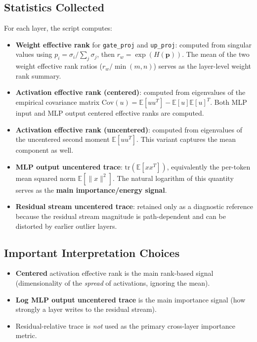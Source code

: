 \documentclass[11pt]{article}
\begin{document}
\subsection{Statistics Collected}
For each layer, the script computes:
\begin{itemize}
    \item \textbf{Weight effective rank} for \texttt{gate\_proj} and \texttt{up\_proj}: computed from singular values using $p_i = \sigma_i / \sum_j \sigma_j$, then $r_w = \exp(H(\mathbf{p}))$.  The mean of the two weight effective rank ratios ($r_w / \min(m,n)$) serves as the layer-level weight rank summary.
    \item \textbf{Activation effective rank (centered)}: computed from eigenvalues of the empirical covariance matrix $\mathrm{Cov}(u) = \mathbb{E}[uu^T] - \mathbb{E}[u]\mathbb{E}[u]^T$.  Both MLP input and MLP output centered effective ranks are computed.
    \item \textbf{Activation effective rank (uncentered)}: computed from eigenvalues of the uncentered second moment $\mathbb{E}[uu^T]$.  This variant captures the mean component as well.
    \item \textbf{MLP output uncentered trace}: $\mathrm{tr}(\mathbb{E}[xx^T])$, equivalently the per-token mean squared norm $\mathbb{E}[\|x\|^2]$.  The natural logarithm of this quantity serves as the \textbf{main importance/energy signal}.
    \item \textbf{Residual stream uncentered trace}: retained only as a diagnostic reference because the residual stream magnitude is path-dependent and can be distorted by earlier outlier layers.
\end{itemize}

\subsection{Important Interpretation Choices}
\begin{itemize}
    \item \textbf{Centered} activation effective rank is the main rank-based signal (dimensionality of the \emph{spread} of activations, ignoring the mean).
    \item \textbf{Log MLP output uncentered trace} is the main importance signal (how strongly a layer writes to the residual stream).
    \item Residual-relative trace is \emph{not} used as the primary cross-layer importance metric.
\end{itemize}
\end{document}
